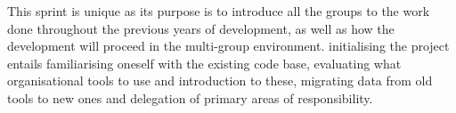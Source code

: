 This sprint is unique as its purpose is to introduce all the groups to the work done throughout the previous years of development, as well as how the development will proceed in the multi-group environment.
initialising the project entails familiarising oneself with the existing code base, evaluating what organisational tools to use and introduction to these, migrating data from old tools to new ones and delegation of primary areas of responsibility.